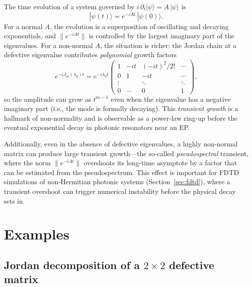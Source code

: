 The time evolution of a system governed by $i\,\partial_t |\psi\rangle
= A\,|\psi\rangle$ is
\begin{equation}
 |\psi(t)\rangle = e^{-iAt}\,|\psi(0)\rangle.
 \label{eq:time-evolution}
\end{equation}
For a normal $A$, the evolution is a superposition of oscillating and
decaying exponentials, and $\|e^{-iAt}\|$ is controlled by the largest
imaginary part of the eigenvalues. For a non-normal $A$, the situation
is richer: the Jordan chain at a defective eigenvalue contributes
\emph{polynomial} growth factors
\begin{equation}
 e^{-iJ_m(\lambda_0)t} = e^{-i\lambda_0 t}
 \begin{pmatrix}
 1 & -it & (-it)^2/2! & \cdots \\
 0 & 1 & -it & \cdots \\
 \vdots & & \ddots & \ddots \\
 0 & \cdots & 0 & 1
 \end{pmatrix},
 \label{eq:jordan-exponential}
\end{equation}
so the amplitude can grow as $t^{m-1}$ even when the eigenvalue has
a negative imaginary part (i.e., the mode is formally decaying). This
\emph{transient growth} is a hallmark of non-normality and is
observable as a power-law ring-up before the eventual exponential
decay in photonic resonators near an EP.

Additionally, even in the absence of defective eigenvalues, a highly
non-normal matrix can produce large transient growth---the so-called
\emph{pseudospectral} transient, where the norm $\|e^{-iAt}\|$ overshoots
its long-time asymptote by a factor that can be estimated from the
pseudospectrum. This effect is important for FDTD simulations of
non-Hermitian photonic systems (Section~\ref{sec:fdtd}), where a
transient overshoot can trigger numerical instability before the
physical decay sets in.


\section{Examples}
\label{sec:nonnormal-examples}

\subsection{Jordan decomposition of a $2\times 2$ defective matrix}
\label{ssec:jordan-2x2}

